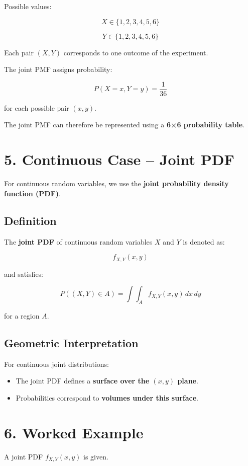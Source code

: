 \documentclass{article}
\begin{document}
Possible values:

\[
X \in \{1,2,3,4,5,6\}
\]

\[
Y \in \{1,2,3,4,5,6\}
\]

Each pair $(X,Y)$ corresponds to one outcome of the experiment.

The joint PMF assigns probability:

\[
P(X=x, Y=y) = \frac{1}{36}
\]

for each possible pair $(x,y)$.

The joint PMF can therefore be represented using a \textbf{6×6 probability table}.

\section*{5. Continuous Case -- Joint PDF}

For continuous random variables, we use the \textbf{joint probability density function (PDF)}.

\subsection*{Definition}

The \textbf{joint PDF} of continuous random variables $X$ and $Y$ is denoted as:

\[
f_{X,Y}(x,y)
\]

and satisfies:

\[
P((X,Y) \in A) = \int\int_A f_{X,Y}(x,y)\,dx\,dy
\]

for a region $A$.

\subsection*{Geometric Interpretation}

For continuous joint distributions:

\begin{itemize}
\item The joint PDF defines a \textbf{surface over the $(x,y)$ plane}.
\item Probabilities correspond to \textbf{volumes under this surface}.
\end{itemize}

\section*{6. Worked Example}

A joint PDF $f_{X,Y}(x,y)$ is given.
\end{document}
